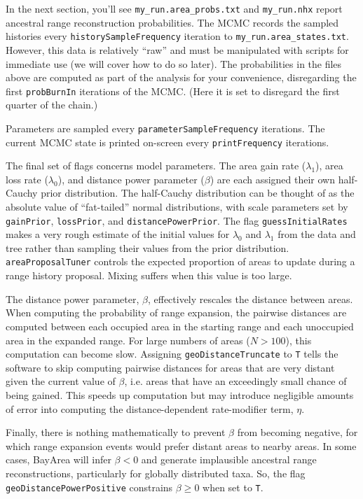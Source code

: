 \documentclass[11pt]{article}
\begin{document}
In the next section, you'll see \texttt{my\_run.area\_probs.txt} and \texttt{my\_run.nhx} report ancestral range reconstruction probabilities.
The MCMC records the sampled histories every \texttt{historySampleFrequency} iteration to \texttt{my\_run.area\_states.txt}.
However, this data is relatively ``raw'' and must be manipulated with scripts for immediate use (we will cover how to do so later).
The probabilities in the files above are computed as part of the analysis for your convenience, disregarding the first \texttt{probBurnIn} iterations of the MCMC.
(Here it is set to disregard the first quarter of the chain.)

Parameters are sampled every \texttt{parameterSampleFrequency} iterations. The current MCMC state is printed on-screen every \texttt{printFrequency} iterations.

The final set of flags concerns model parameters.
The area gain rate ($\lambda_1$), area loss rate ($\lambda_0$), and distance power parameter ($\beta$) are each assigned their own half-Cauchy prior distribution.
The half-Cauchy distribution can be thought of as the absolute value of ``fat-tailed'' normal distributions, with scale parameters set by \texttt{gainPrior}, \texttt{lossPrior}, and \texttt{distancePowerPrior}.
The flag \texttt{guessInitialRates} makes a very rough estimate of the initial values for $\lambda_0$ and $\lambda_1$ from the data and tree rather than sampling their values from the prior distribution.
\texttt{areaProposalTuner} controls the expected proportion of areas to update during a range history proposal.
Mixing suffers when this value is too large.

The distance power parameter, $\beta$, effectively rescales the distance between areas.
When computing the probability of range expansion, the pairwise distances are computed between each occupied area in the starting range and each unoccupied area in the expanded range.
For large numbers of areas ($N > 100$), this computation can become slow.
Assigning \texttt{geoDistanceTruncate} to \texttt{T} tells the software to skip computing pairwise distances for areas that are very distant given the current value of $\beta$, i.e. areas that have an exceedingly small chance of being gained.
This speeds up computation but may introduce negligible amounts of error into computing the distance-dependent rate-modifier term, $\eta$.

Finally, there is nothing mathematically to prevent $\beta$ from becoming negative, for which range expansion events would prefer distant areas to nearby areas.
In some cases, BayArea will infer $\beta<0$ and generate implausible ancestral range reconstructions, particularly for globally distributed taxa.
So, the flag \texttt{geoDistancePowerPositive} constrains $\beta \geq 0$ when set to \texttt{T}.
\end{document}
